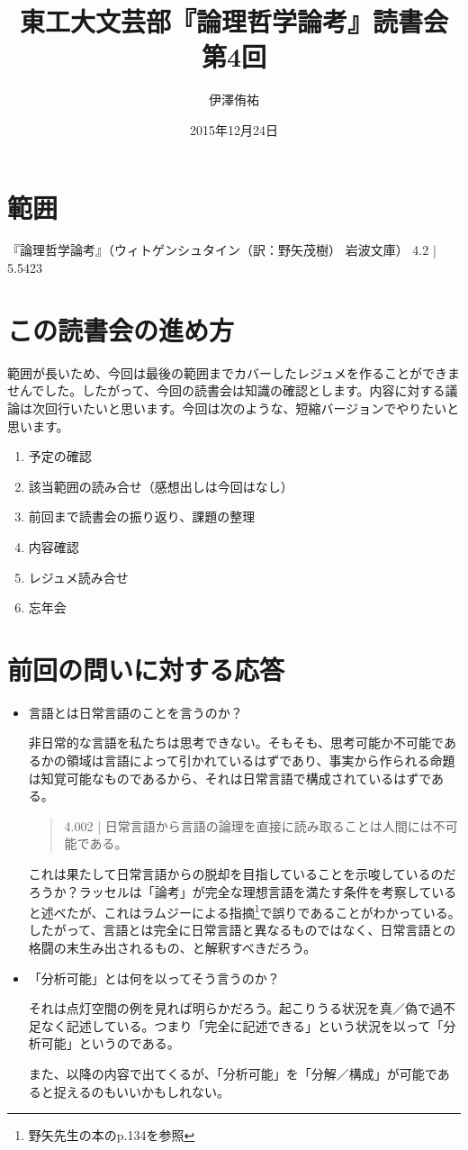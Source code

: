 \documentclass[a4paper,onecolumn,openany,article]{jsarticle}
\title{東工大文芸部『論理哲学論考』読書会 第4回}
\author{伊澤侑祐}
\date{2015年12月24日}
\begin{document}
\maketitle

\section*{範囲}
『論理哲学論考』（ウィトゲンシュタイン（訳：野矢茂樹） 岩波文庫） 4.2 | 5.5423

\section{この読書会の進め方}
範囲が長いため、今回は最後の範囲までカバーしたレジュメを作ることができませんでした。したがって、今回の読書会は知識の確認とします。内容に対する議論は次回行いたいと思います。今回は次のような、短縮バージョンでやりたいと思います。
\begin{enumerate}
  \item 予定の確認
  \item 該当範囲の読み合せ（感想出しは今回はなし）
  \item 前回まで読書会の振り返り、課題の整理
  \item 内容確認
  \item レジュメ読み合せ
  \item 忘年会
\end{enumerate}

\section{前回の問いに対する応答}
\begin{itemize}
  \item 言語とは日常言語のことを言うのか？

  非日常的な言語を私たちは思考できない。そもそも、思考可能か不可能であるかの領域は言語によって引かれているはずであり、事実から作られる命題は知覚可能なものであるから、それは日常言語で構成されているはずである。
  \begin{quote}
     4.002 | 日常言語から言語の論理を直接に読み取ることは人間には不可能である。
  \end{quote}

  これは果たして日常言語からの脱却を目指していることを示唆しているのだろうか？ラッセルは「論考」が完全な理想言語を満たす条件を考察していると述べたが、これはラムジーによる指摘\footnote{野矢先生の本のp.134を参照}で誤りであることがわかっている。したがって、言語とは完全に日常言語と異なるものではなく、日常言語との格闘の末生み出されるもの、と解釈すべきだろう。

  \item 「分析可能」とは何を以ってそう言うのか？

  それは点灯空間の例を見れば明らかだろう。起こりうる状況を真／偽で過不足なく記述している。つまり「完全に記述できる」という状況を以って「分析可能」というのである。

  また、以降の内容で出てくるが、「分析可能」を「分解／構成」が可能であると捉えるのもいいかもしれない。

\end{itemize}
\end{document}
